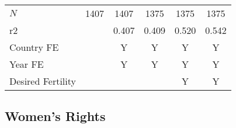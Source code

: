 \documentclass[10pt,letterpaper,subeqn]{beamer}
\begin{document}
\begin{frame}[label=DSRanalysis]
\begin{table}[htbp]
\begin{tabular}{l*{5}{c}}
\hline
\(N\)       &        1407         &        1407         &        1375         &        1375         &              1375         \\
r2          &                     &       0.407         &       0.409         &       0.520         &           0.542         \\
\hline
Country FE        &                     &    Y                 &      Y               &     Y         &               Y         \\
Year FE            &                     &    Y                 &      Y               &     Y         &             Y         \\
Desired Fertility &                     &                     &                     &       Y&             Y\\

\hline\hline
\end{tabular}
\end{table}
\end{frame}

\subsection{Women's Rights}
\end{document}

